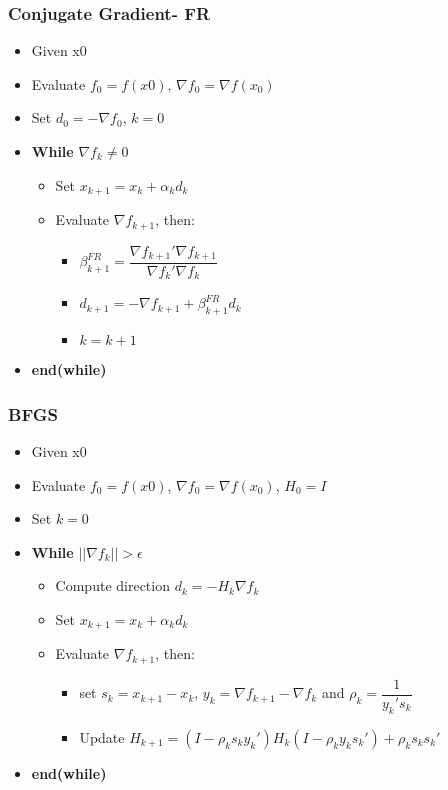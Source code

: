 \documentclass{beamer}
\newcommand{\1}{\mathbb{1}}
\begin{document}
\begin{frame}\frametitle{Conjugate Gradient- FR}
\begin{itemize}
\item Given x0
\item Evaluate $f_0 = f(x0)$, $\nabla f_0 = \nabla f(x_0)$
\item Set $d_0 = - \nabla f_0$, $k=0$
\item \textbf{While} $\nabla f_k \neq 0$
\begin{itemize}
\item Set $x_{k+1} = x_k + \alpha_k d_k$
\item Evaluate $\nabla f_{k+1}$, then:
\begin{itemize}
\item $\beta^{FR}_{k+1} = \dfrac{\nabla f_{k+1}' \nabla f_{k+1}}{\nabla f_{k}'\nabla f_{k}}$
\item $d_{k+1} = -\nabla f_{k+1} + \beta^{FR}_{k+1} d_k$
\item $k = k+1$
\end{itemize}
\end{itemize}
\item \textbf{end(while)}
\end{itemize}
\end{frame}

\begin{frame}\frametitle{BFGS}
\begin{itemize}
\item Given x0
\item Evaluate $f_0 = f(x0)$, $\nabla f_0 = \nabla f(x_0)$, $H_0=I$
\item Set $k=0$
\item \textbf{While} $||\nabla f_k || >\epsilon$
\begin{itemize}
\item Compute direction $d_k = -H_k\nabla f_k$
\item Set $x_{k+1} = x_k + \alpha_k d_k$
\item Evaluate $\nabla f_{k+1}$, then:
{\large
\begin{itemize}
\item set $s_k = x_{k+1}-x_k$, $y_k=\nabla f_{k+1}-\nabla f_k$ and $\rho_k= \dfrac{1}{y_k's_k}$
\item Update $H_{k+1} = (I-\rho_k s_k y_k')H_k(I-\rho_k y_k s_k') + \rho_k s_k s_k'$
\end{itemize}}
\end{itemize}
\item \textbf{end(while)}
\end{itemize}
\end{frame}
\end{document}
